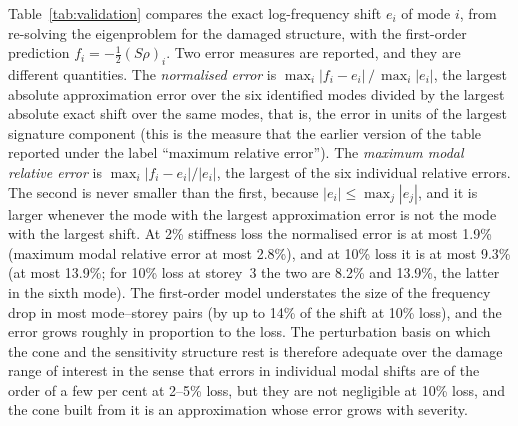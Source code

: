 \documentclass[12pt,a4paper]{article}
\newenvironment{revblock}{}{}
\newenvironment{revblock}{\begingroup\color{revcol}}{\endgroup}
\newcommand{\rtwo}[1]{#1}
\newcommand{\rtwo}[1]{{\color{revcolb}#1}}
\begin{document}
\begin{revblock}
\rtwo{Table~\ref{tab:validation} compares the exact log-frequency shift $e_i$ of mode $i$, from re-solving the eigenproblem for the damaged structure, with the first-order prediction $f_i=-\tfrac12(S\rho)_i$.} \rtwo{Two error measures are reported, and they are different quantities.} \rtwo{The \emph{normalised error} is $\max_i|f_i-e_i|\,/\,\max_i|e_i|$, the largest absolute approximation error over the six identified modes divided by the largest absolute exact shift over the same modes, that is, the error in units of the largest signature component (this is the measure that the earlier version of the table reported under the label ``maximum relative error'').} \rtwo{The \emph{maximum modal relative error} is $\max_i|f_i-e_i|/|e_i|$, the largest of the six individual relative errors.} \rtwo{The second is never smaller than the first, because $|e_i|\le\max_j|e_j|$, and it is larger whenever the mode with the largest approximation error is not the mode with the largest shift.} \rtwo{At 2\% stiffness loss the normalised error is at most 1.9\% (maximum modal relative error at most 2.8\%), and at 10\% loss it is at most 9.3\% (at most 13.9\%; for 10\% loss at storey~3 the two are 8.2\% and 13.9\%, the latter in the sixth mode).} \rtwo{The first-order model understates the size of the frequency drop in most mode--storey pairs (by up to 14\% of the shift at 10\% loss), and the error grows roughly in proportion to the loss.} \rtwo{The perturbation basis on which the cone and the sensitivity structure rest is therefore adequate over the damage range of interest in the sense that errors in individual modal shifts are of the order of a few per cent at 2--5\% loss, but they are not negligible at 10\% loss, and the cone built from it is an approximation whose error grows with severity.}


\end{revblock}
\end{document}
